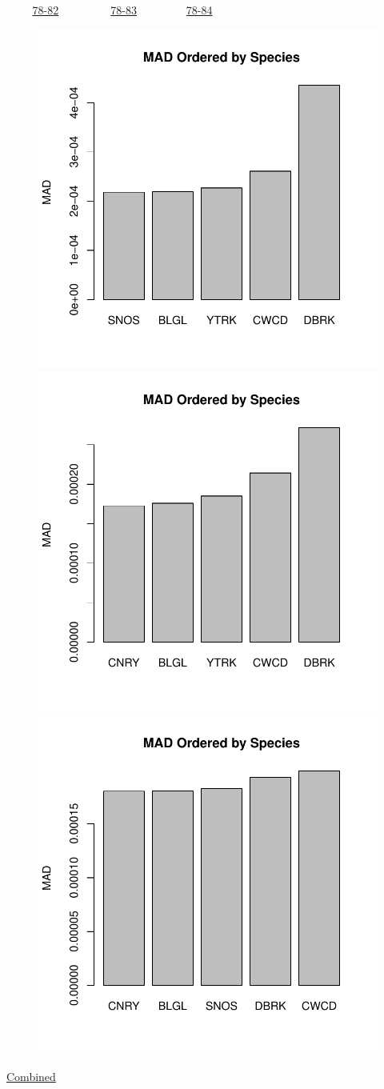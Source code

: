 \documentclass[ xcolor = pdftex, dvipsnames, table ]{beamer}
\begin{document}
\begin{frame}{$~~~~~~~~~$ \href{https://github.com/gasduster99/sppComp/tree/master/sscRuns/25319781982M4}{78-82} $~~~~~~~~~~~~~~~~~~$ \href{https://github.com/gasduster99/sppComp/tree/master/sscRuns/25319781983M4}{78-83} $~~~~~~~~~~~~~~~~~$ \href{https://github.com/gasduster99/sppComp/tree/master/sscRuns/25319781984M4}{78-84} }
        \begin{figure}[ht!]
        \centering
        \hspace*{-1cm}
        \includegraphics[width=.4\textwidth]{../sscRuns/25319781982M4/sppTailMad68.pdf}
        \includegraphics[width=.4\textwidth]{../sscRuns/25319781983M4/sppTailMad68.pdf}
        \includegraphics[width=.4\textwidth]{../sscRuns/25319781984M4/sppTailMad68.pdf}
        \end{figure}
	\vspace{-1cm}
	\begin{center}
	\Large
	\href{https://github.com/gasduster99/sppComp/tree/master/try1/postSSC/25319781982345M4}{Combined}
	\end{center}
\end{frame}
\end{document}
